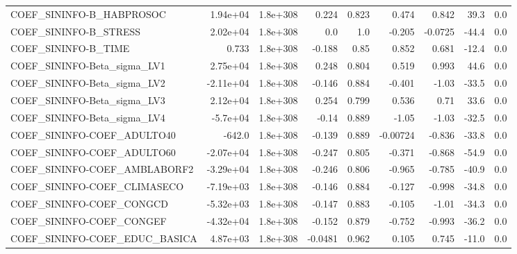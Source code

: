 \begin{tabular}{lrrrrrrrr}
COEF\_SININFO-B\_HABPROSOC          &    1.94e+04 &     1.8e+308 &    0.224 &    0.823 &      0.474 &       0.842 &         39.3 &           0.0 \\
COEF\_SININFO-B\_STRESS             &    2.02e+04 &     1.8e+308 &      0.0 &      1.0 &     -0.205 &     -0.0725 &        -44.4 &           0.0 \\
COEF\_SININFO-B\_TIME               &       0.733 &     1.8e+308 &   -0.188 &     0.85 &      0.852 &       0.681 &        -12.4 &           0.0 \\
COEF\_SININFO-Beta\_sigma\_LV1       &    2.75e+04 &     1.8e+308 &    0.248 &    0.804 &      0.519 &       0.993 &         44.6 &           0.0 \\
COEF\_SININFO-Beta\_sigma\_LV2       &   -2.11e+04 &     1.8e+308 &   -0.146 &    0.884 &     -0.401 &       -1.03 &        -33.5 &           0.0 \\
COEF\_SININFO-Beta\_sigma\_LV3       &    2.12e+04 &     1.8e+308 &    0.254 &    0.799 &      0.536 &        0.71 &         33.6 &           0.0 \\
COEF\_SININFO-Beta\_sigma\_LV4       &    -5.7e+04 &     1.8e+308 &    -0.14 &    0.889 &      -1.05 &       -1.03 &        -32.5 &           0.0 \\
COEF\_SININFO-COEF\_ADULTO40        &      -642.0 &     1.8e+308 &   -0.139 &    0.889 &   -0.00724 &      -0.836 &        -33.8 &           0.0 \\
COEF\_SININFO-COEF\_ADULTO60        &   -2.07e+04 &     1.8e+308 &   -0.247 &    0.805 &     -0.371 &      -0.868 &        -54.9 &           0.0 \\
COEF\_SININFO-COEF\_AMBLABORF2      &   -3.29e+04 &     1.8e+308 &   -0.246 &    0.806 &     -0.965 &      -0.785 &        -40.9 &           0.0 \\
COEF\_SININFO-COEF\_CLIMASECO       &   -7.19e+03 &     1.8e+308 &   -0.146 &    0.884 &     -0.127 &      -0.998 &        -34.8 &           0.0 \\
COEF\_SININFO-COEF\_CONGCD          &   -5.32e+03 &     1.8e+308 &   -0.147 &    0.883 &     -0.105 &       -1.01 &        -34.3 &           0.0 \\
COEF\_SININFO-COEF\_CONGEF          &   -4.32e+04 &     1.8e+308 &   -0.152 &    0.879 &     -0.752 &      -0.993 &        -36.2 &           0.0 \\
COEF\_SININFO-COEF\_EDUC\_BASICA     &    4.87e+03 &     1.8e+308 &  -0.0481 &    0.962 &      0.105 &       0.745 &        -11.0 &           0.0 \\

\end{tabular}
